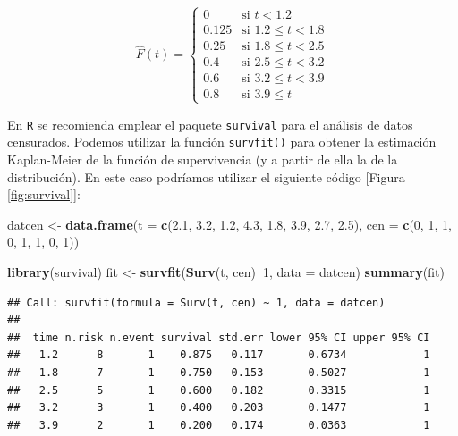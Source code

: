 \documentclass[]{book}
\newenvironment{Shaded}{\begin{snugshade}}{\end{snugshade}}
\newcommand{\KeywordTok}[1]{\textcolor[rgb]{0.13,0.29,0.53}{\textbf{#1}}}
\newcommand{\DataTypeTok}[1]{\textcolor[rgb]{0.13,0.29,0.53}{#1}}
\newcommand{\DecValTok}[1]{\textcolor[rgb]{0.00,0.00,0.81}{#1}}
\newcommand{\FloatTok}[1]{\textcolor[rgb]{0.00,0.00,0.81}{#1}}
\newcommand{\StringTok}[1]{\textcolor[rgb]{0.31,0.60,0.02}{#1}}
\newcommand{\OperatorTok}[1]{\textcolor[rgb]{0.81,0.36,0.00}{\textbf{#1}}}
\newcommand{\NormalTok}[1]{#1}
\theoremstyle{definition}
\theoremstyle{definition}
\theoremstyle{definition}
\theoremstyle{remark}
\begin{document}
\[\hat{F}\left( t \right) =\left\{ 
\begin{array}{ll}
0& \text{si } t<1.2 \\ 
0.125& \text{si } 1.2\leq t<1.8 \\ 
0.25& \text{si } 1.8\leq t<2.5 \\ 
0.4& \text{si } 2.5\leq t<3.2 \\ 
0.6& \text{si } 3.2\leq t<3.9 \\ 
0.8& \text{si } 3.9\leq t
\end{array}
\right.\]

En \texttt{R} se recomienda emplear el paquete \texttt{survival} para el
análisis de datos censurados. Podemos utilizar la función
\texttt{survfit()} para obtener la estimación Kaplan-Meier de la función
de supervivencia (y a partir de ella la de la distribución). En este
caso podríamos utilizar el siguiente código {[}Figura
\ref{fig:survival}{]}:

\begin{Shaded}
\begin{Highlighting}[]
\NormalTok{datcen <-}\StringTok{ }\KeywordTok{data.frame}\NormalTok{(}\DataTypeTok{t =} \KeywordTok{c}\NormalTok{(}\FloatTok{2.1}\NormalTok{, }\FloatTok{3.2}\NormalTok{, }\FloatTok{1.2}\NormalTok{, }\FloatTok{4.3}\NormalTok{, }\FloatTok{1.8}\NormalTok{, }\FloatTok{3.9}\NormalTok{, }\FloatTok{2.7}\NormalTok{, }\FloatTok{2.5}\NormalTok{), }
                 \DataTypeTok{cen =} \KeywordTok{c}\NormalTok{(}\DecValTok{0}\NormalTok{, }\DecValTok{1}\NormalTok{, }\DecValTok{1}\NormalTok{, }\DecValTok{0}\NormalTok{, }\DecValTok{1}\NormalTok{, }\DecValTok{1}\NormalTok{, }\DecValTok{0}\NormalTok{, }\DecValTok{1}\NormalTok{))}

\KeywordTok{library}\NormalTok{(survival)}
\NormalTok{fit <-}\StringTok{ }\KeywordTok{survfit}\NormalTok{(}\KeywordTok{Surv}\NormalTok{(t, cen)}\OperatorTok{~}\DecValTok{1}\NormalTok{, }\DataTypeTok{data =}\NormalTok{ datcen)}
\KeywordTok{summary}\NormalTok{(fit)}
\end{Highlighting}
\end{Shaded}

\begin{verbatim}
## Call: survfit(formula = Surv(t, cen) ~ 1, data = datcen)
## 
##  time n.risk n.event survival std.err lower 95% CI upper 95% CI
##   1.2      8       1    0.875   0.117       0.6734            1
##   1.8      7       1    0.750   0.153       0.5027            1
##   2.5      5       1    0.600   0.182       0.3315            1
##   3.2      3       1    0.400   0.203       0.1477            1
##   3.9      2       1    0.200   0.174       0.0363            1
\end{verbatim}
\end{document}
